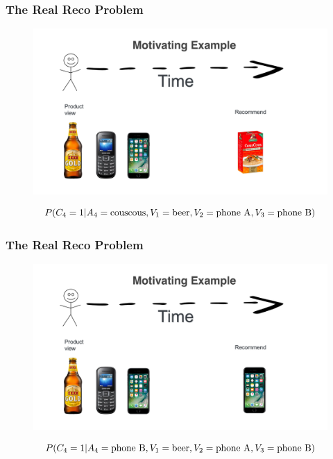  \begin{frame}
  \frametitle{The Real Reco Problem}
 
 
   \begin{figure}[h!]
     \includegraphics[scale=0.25]{images/mot_ex3.png}
       \centering
       \label{motex1}
   \end{figure}

   \[
   P(C_4=1|A_4={\rm couscous} , V_1 = {\rm beer}, V_2 = {\rm phone ~ A}, V_3 = {\rm phone ~ B}) 
   \]

   
 \end{frame}


 \begin{frame}
  \frametitle{The Real Reco Problem}
 
 
   \begin{figure}[h!]
     \includegraphics[scale=0.25]{images/mot_ex2.png}
       \centering
       \label{motex1}
   \end{figure}

   \[
   P(C_4=1|A_4={\rm phone ~ B} , V_1 = {\rm beer}, V_2 = {\rm phone ~ A}, V_3 = {\rm phone ~ B}) 
   \]

 \end{frame}



